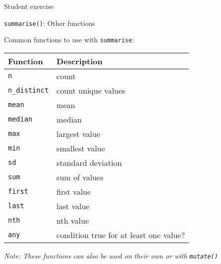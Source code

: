 \documentclass[8pt,ignorenonframetext,dvipsnames]{beamer}
\begin{document}
\begin{frame}{Student exercise}

\end{frame}

\begin{frame}[fragile]{\texttt{summarise()}: Other functions}

Common functions to use with \texttt{summarise}:

\begin{longtable}[]{@{}ll@{}}
\toprule
Function & Description\tabularnewline
\midrule
\endhead
\texttt{n} & count\tabularnewline
\texttt{n\_distinct} & count unique values\tabularnewline
\texttt{mean} & mean\tabularnewline
\texttt{median} & median\tabularnewline
\texttt{max} & largest value\tabularnewline
\texttt{min} & smallest value\tabularnewline
\texttt{sd} & standard deviation\tabularnewline
\texttt{sum} & sum of values\tabularnewline
\texttt{first} & first value\tabularnewline
\texttt{last} & last value\tabularnewline
\texttt{nth} & nth value\tabularnewline
\texttt{any} & condition true for at least one value?\tabularnewline
\bottomrule
\end{longtable}

\emph{Note: These functions can also be used on their own or with
\texttt{mutate()}}

\end{frame}
\end{document}
